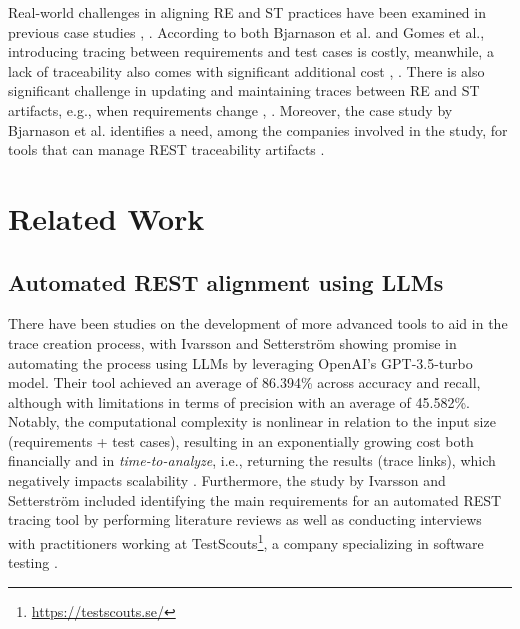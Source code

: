 \documentclass[conference]{IEEEtran}
\begin{document}
Real-world challenges in aligning RE and ST practices have been examined in
previous case studies \cite{bjarnason2014Challenges},
\cite{gomes2017Challenges}. According to both Bjarnason et al. and Gomes et
al., introducing tracing between requirements and test cases is costly,
meanwhile, a lack of traceability also comes with significant additional cost
\cite{bjarnason2014Challenges}, \cite{gomes2017Challenges}. There is also
significant challenge in updating and maintaining traces between RE and ST
artifacts, e.g., when requirements change \cite{bjarnason2014Challenges},
\cite{gomes2017Challenges}. Moreover, the case study by Bjarnason et al.
identifies a need, among the companies involved in the study, for tools that can
manage REST traceability artifacts \cite{bjarnason2014Challenges}.

\section{Related Work}\label{relatedWork}

\subsection{Automated REST alignment using LLMs} 

There have been studies on the development of more advanced tools to aid in the
trace creation process, with Ivarsson and Setterström showing promise in
automating the process using LLMs by leveraging OpenAI’s GPT-3.5-turbo
model\cite{ivarsson2023automated}. Their tool achieved an average of 86.394\%
across accuracy and recall, although with limitations in terms of precision with
an average of 45.582\%. Notably, the computational complexity is nonlinear in
relation to the input size (requirements + test cases), resulting in an
exponentially growing cost both financially and in \textit{time-to-analyze},
i.e., returning the results (trace links), which negatively impacts scalability
\cite{ivarsson2023automated}. Furthermore, the study by Ivarsson and Setterström
included identifying the main requirements for an automated REST tracing tool by
performing literature reviews as well as conducting interviews with
practitioners working at TestScouts\footnote{\url{https://testscouts.se/}}, a
company specializing in software testing \cite{ivarsson2023automated}.
\end{document}
